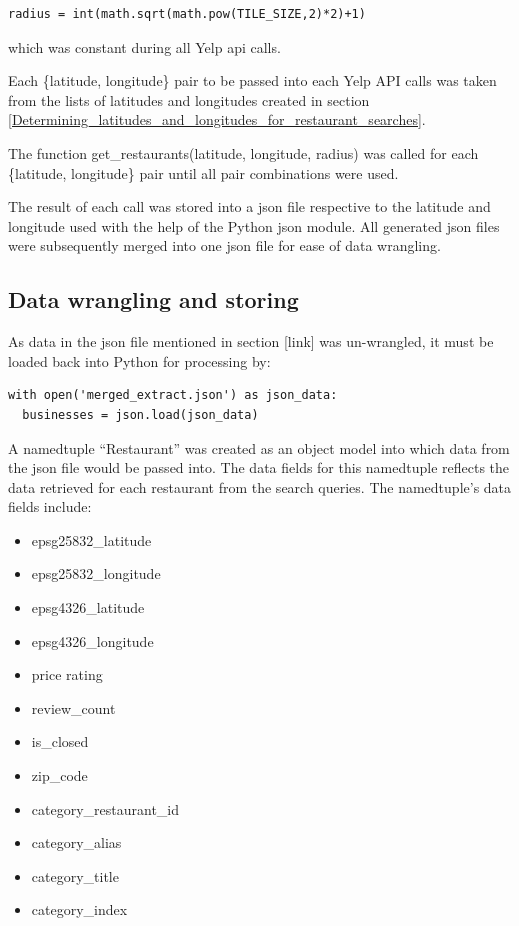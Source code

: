 \documentclass[a4paper, 11pt, oneside]{Thesis}  %
\begin{document}
\begin{verbatim}
radius = int(math.sqrt(math.pow(TILE_SIZE,2)*2)+1)
\end{verbatim}

which was constant during all Yelp \ac{api} calls.

Each \{latitude, longitude\} pair to be passed into each Yelp API calls was taken from the lists of latitudes and longitudes created in section \ref{Determining_latitudes_and_longitudes_for_restaurant_searches}.

The function get\_restaurants(latitude, longitude, radius) was called for each \{latitude, longitude\} pair until all pair combinations were used.

The result of each call was stored into a \ac{json} file respective to the latitude and longitude used with the help of the Python \ac{json} \cite{json.encoder} module. All generated \ac{json} files were subsequently merged into one \ac{json} file for ease of data wrangling.

\subsection{Data wrangling and storing}

As data in the \ac{json} file mentioned in section [link] was un-wrangled, it must be loaded back into Python for processing by:
\begin{verbatim}
with open('merged_extract.json') as json_data:
  businesses = json.load(json_data)
\end{verbatim}

A namedtuple ``Restaurant'' was created as an object model into which data from the \ac{json} file would be passed into. The data fields for this namedtuple reflects the data retrieved for each restaurant from the search queries. The namedtuple’s data fields include:
\begin{itemize}
\item epsg25832\_latitude
\item epsg25832\_longitude
\item epsg4326\_latitude
\item epsg4326\_longitude
\item price rating
\item review\_count
\item is\_closed
\item zip\_code
\item category\_restaurant\_id 
\item category\_alias
\item category\_title
\item category\_index
\end{itemize}
\end{document}
